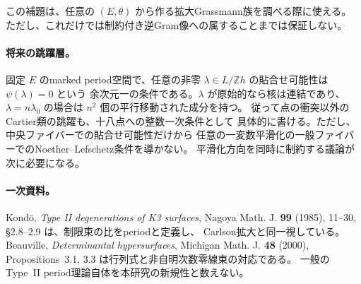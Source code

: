 この補題は、任意の $(E,\theta)$ から作る拡大Grassmann族を調べる際に使える。
ただし、これだけでは制約付き逆Gram像への属することまでは保証しない。

\paragraph{将来の跳躍層。}
固定 $E$ のmarked period空間で、任意の非零
$\lambda\in L/\mathbb Zh$ の貼合せ可能性は $\psi(\lambda)=0$ という
余次元一の条件である。$\lambda$ が原始的なら核は連結であり、
$\lambda=n\lambda_0$ の場合は $n^2$ 個の平行移動された成分を持つ。
従って点の衝突以外のCartier類の跳躍も、十八点への整数一次条件として
具体的に書ける。ただし、中央ファイバーでの貼合せ可能性だけから
任意の一変数平滑化の一般ファイバーでのNoether--Lefschetz条件を導かない。
平滑化方向を同時に制約する議論が次に必要になる。

\paragraph{一次資料。}
Kond\=o, \emph{Type II degenerations of K3 surfaces}, Nagoya Math. J.
\textbf{99} (1985), 11--30, \S2.8--2.9 は、制限束の比をperiodと定義し、
Carlson拡大と同一視している。Beauville,
\emph{Determinantal hypersurfaces}, Michigan Math. J. \textbf{48} (2000),
Propositions~3.1, 3.3 は行列式と非自明次数零線束の対応である。
一般のType~II period理論自体を本研究の新規性と数えない。
